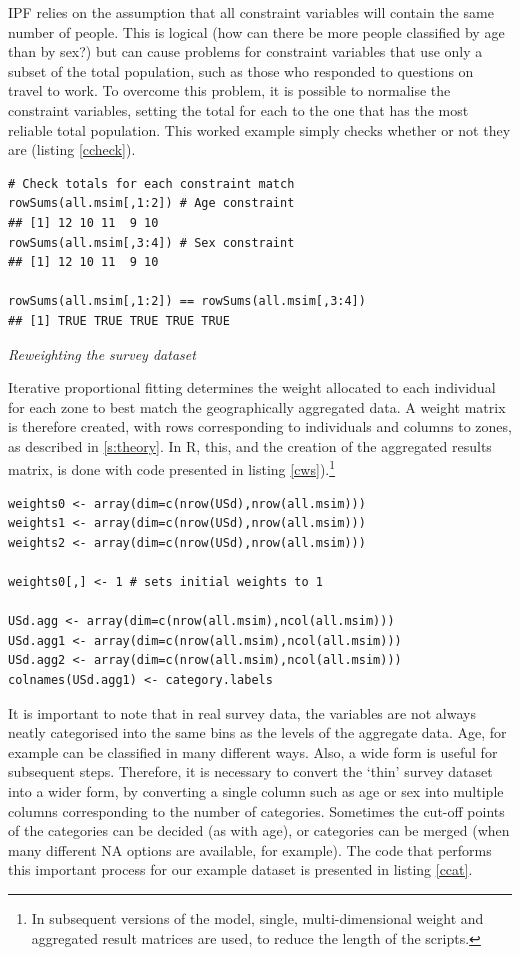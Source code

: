 \documentclass[a4paper, 11pt, twoside]{article}
\begin{document}
IPF relies on the assumption that all constraint variables will contain the
same number of people. This is logical (how can there be more people classified
by age than by sex?) but can cause problems for constraint variables that use
only a subset of the total population, such as those who responded to questions on
travel to work. To overcome this problem, it is possible to normalise the
constraint variables, setting the total for each to the one that has the most
reliable total population. This worked example simply checks whether
or not they are (listing \ref{ccheck}).

\begin{lstlisting}[float=h, caption={R code to check the constrain populations
match}, label=ccheck]
 # Check totals for each constraint match
rowSums(all.msim[,1:2]) # Age constraint
## [1] 12 10 11  9 10
rowSums(all.msim[,3:4]) # Sex constraint
## [1] 12 10 11  9 10

rowSums(all.msim[,1:2]) == rowSums(all.msim[,3:4])
## [1] TRUE TRUE TRUE TRUE TRUE
\end{lstlisting}

\emph{Reweighting the survey dataset}

Iterative proportional fitting determines the weight allocated to each
individual for each zone to best match the geographically aggregated data.
A weight matrix is therefore created, with rows corresponding to individuals
and columns to zones, as described in \cref{s:theory}. In
R, this, and the creation of the aggregated results matrix,
is done with code presented in listing
\ref{cws}).\footnote{In subsequent
versions of the model, single, multi-dimensional weight and
aggregated result matrices are used,
to reduce the length of the scripts.
} 

\begin{lstlisting}[float=h, caption={Creating arrays of weights in R},
label=cws]
weights0 <- array(dim=c(nrow(USd),nrow(all.msim)))
weights1 <- array(dim=c(nrow(USd),nrow(all.msim)))
weights2 <- array(dim=c(nrow(USd),nrow(all.msim)))

weights0[,] <- 1 # sets initial weights to 1

USd.agg <- array(dim=c(nrow(all.msim),ncol(all.msim)))
USd.agg1 <- array(dim=c(nrow(all.msim),ncol(all.msim)))
USd.agg2 <- array(dim=c(nrow(all.msim),ncol(all.msim)))
colnames(USd.agg1) <- category.labels
\end{lstlisting}

It is important to note that in real survey data, the variables are not
always neatly categorised into the same bins as the levels of the aggregate
data. Age, for example can be classified in many different ways.
Also, a wide form is useful for subsequent steps.
Therefore, it is necessary to convert the `thin' survey dataset
into a wider form, by converting a single column such as age or sex into
multiple columns corresponding to the number of categories. Sometimes the
cut-off points of the categories can be decided (as with age), or categories
can be merged (when many different NA options are available, for example).
The code that performs this important process for our example dataset is
presented in listing \ref{ccat}.
\end{document}
